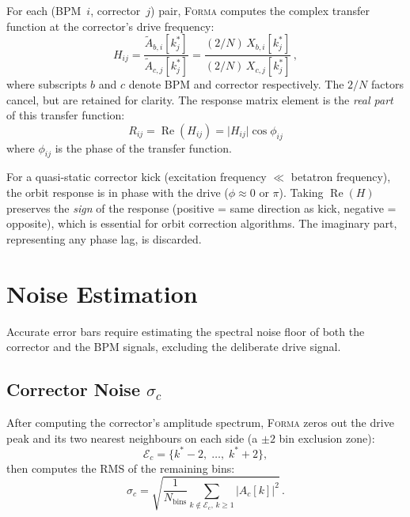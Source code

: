 \documentclass[11pt,a4paper,twoside]{report}
\newcommand{\forma}{\textsc{Forma}}
\begin{document}
For each (BPM~$i$, corrector~$j$) pair, \forma{} computes the complex transfer function at the corrector's drive frequency:
\begin{equation}\label{eq:transfer}
  H_{ij}
  = \frac{\tilde{A}_{b,i}[k^{*}_j]}{\tilde{A}_{c,j}[k^{*}_j]}
  = \frac{(2/N)\,X_{b,i}[k^{*}_j]}{(2/N)\,X_{c,j}[k^{*}_j]}\,,
\end{equation}
where subscripts $b$ and $c$ denote BPM and corrector respectively. The $2/N$ factors cancel, but are retained for clarity. The response matrix element is the \emph{real part} of this transfer function:
\begin{equation}\label{eq:Rij}
  \boxed{\;R_{ij} = \operatorname{Re}(H_{ij}) = \lvert H_{ij}\rvert\cos\phi_{ij}\;}
\end{equation}
where $\phi_{ij}$ is the phase of the transfer function.

\begin{notebox}
For a quasi-static corrector kick (excitation frequency $\ll$ betatron frequency), the orbit response is in phase with the drive ($\phi\approx0$ or $\pi$). Taking $\operatorname{Re}(H)$ preserves the \emph{sign} of the response (positive = same direction as kick, negative = opposite), which is essential for orbit correction algorithms. The imaginary part, representing any phase lag, is discarded.
\end{notebox}

\section{Noise Estimation}\label{sec:noise}

Accurate error bars require estimating the spectral noise floor of both the corrector and the BPM signals, excluding the deliberate drive signal.

\subsection{Corrector Noise $\sigma_c$}

After computing the corrector's amplitude spectrum, \forma{} zeros out the drive peak and its two nearest neighbours on each side (a $\pm2$ bin exclusion zone):
\begin{equation}
  \mathcal{E}_c = \{k^{*}{-}2,\;\dots,\;k^{*}{+}2\},
\end{equation}
then computes the RMS of the remaining bins:
\begin{equation}\label{eq:corrnoise}
  \sigma_c = \sqrt{\frac{1}{N_{\text{bins}}}
    \sum_{k\notin\mathcal{E}_c,\,k\ge1} \bigl\lvert A_c[k]\bigr\rvert^2}\,.
\end{equation}
\end{document}

